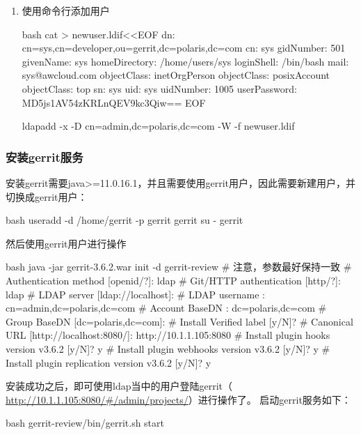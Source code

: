 \begin{enumerate}
\begin{code-block}{bash}
  # 启动httpd
  systemctl start httpd
  systemctl enable httpd

  # 使用浏览器访问http://<ip>/ldapadmin，用户名/密码cn=admin,dc=polaris,dc=com/passwd
  \end{code-block}

  \item 使用命令行添加用户
  \begin{code-block}{bash}
  cat > newuser.ldif<<EOF
  dn: cn=sys,cn=developer,ou=gerrit,dc=polaris,dc=com
  cn: sys
  gidNumber: 501
  givenName: sys
  homeDirectory: /home/users/sys
  loginShell: /bin/bash
  mail: sys@awcloud.com
  objectClass: inetOrgPerson
  objectClass: posixAccount
  objectClass: top
  sn: sys
  uid: sys
  uidNumber: 1005
  userPassword: {MD5}js1AV54zKRLnQEV9kc3Qiw==
  EOF

  ldapadd -x -D cn=admin,dc=polaris,dc=com -W -f newuser.ldif
  \end{code-block}


\end{enumerate}

\subsubsection{安装gerrit服务}
安装gerrit需要java>=11.0.16.1，并且需要使用gerrit用户，因此需要新建用户，并切换成gerrit用户：
\begin{code-block}{bash}
useradd -d /home/gerrit  -p gerrit  gerrit
su - gerrit
\end{code-block}

然后使用gerrit用户进行操作
\begin{code-block}{bash}
java -jar gerrit-3.6.2.war init -d gerrit-review
# 注意，参数最好保持一致
# Authentication method          [openid/?]: ldap
# Git/HTTP authentication        [http/?]: ldap
# LDAP server                    [ldap://localhost]:
# LDAP username                  : cn=admin,dc=polaris,dc=com
# Account BaseDN                 : dc=polaris,dc=com
# Group BaseDN                   [dc=polaris,dc=com]:
# Install Verified label         [y/N]?
# Canonical URL                  [http://localhost:8080/]: http://10.1.1.105:8080
# Install plugin hooks version v3.6.2 [y/N]? y
# Install plugin webhooks version v3.6.2 [y/N]? y
# Install plugin replication version v3.6.2 [y/N]? y
\end{code-block}

安装成功之后，即可使用ldap当中的用户登陆gerrit（\url{ http://10.1.1.105:8080/#/admin/projects/}）进行操作了。
启动gerrit服务如下：
\begin{code-block}{bash}
gerrit-review/bin/gerrit.sh start
\end{code-block}

